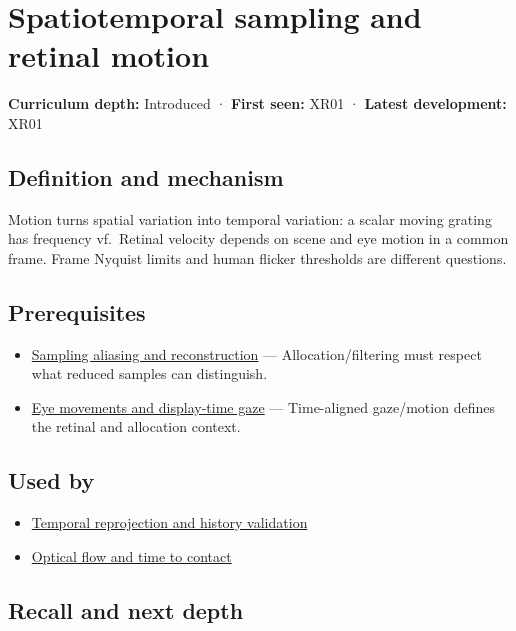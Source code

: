 \hypertarget{appendix-70895739febb}{}
\section{Spatiotemporal sampling and retinal motion}\label{appendix-70895739febb-spatiotemporal-sampling-and-retinal-motion}

\textbf{Curriculum depth:} Introduced · \textbf{First seen:} XR01 · \textbf{Latest development:} XR01

\subsection{Definition and mechanism}\label{appendix-70895739febb-definition-and-mechanism}

Motion turns spatial variation into temporal variation: a scalar moving grating has frequency \textbar v\textbar f.~Retinal velocity depends on scene and eye motion in a common frame. Frame Nyquist limits and human flicker thresholds are different questions.

\subsection{Prerequisites}\label{appendix-70895739febb-prerequisites}

\begin{itemize}
\tightlist
\item
  \hyperref[appendix-6a7869dd79a6]{Sampling aliasing and reconstruction} --- Allocation/filtering must respect what reduced samples can distinguish.
\item
  \hyperref[appendix-a6f2c4fe1996]{Eye movements and display-time gaze} --- Time-aligned gaze/motion defines the retinal and allocation context.
\end{itemize}

\subsection{Used by}\label{appendix-70895739febb-used-by}

\begin{itemize}
\tightlist
\item
  \hyperref[appendix-0727340a4428]{Temporal reprojection and history validation}
\item
  \hyperref[appendix-e2e73f8cd93e]{Optical flow and time to contact}
\end{itemize}

\subsection{Recall and next depth}\label{appendix-70895739febb-recall-and-next-depth}

